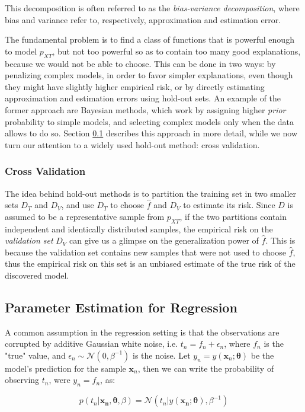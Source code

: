 \documentclass[12pt]{book}
\begin{document}
This decomposition is often referred to as the \emph{bias-variance decomposition}, where bias and variance refer to, respectively, approximation and estimation error.

The fundamental problem is to find a class of functions that is powerful enough to model $p_{XT}$, but not too powerful so as to contain too many good explanations, because we would not be able to choose. This can be done in two ways: by penalizing complex models, in order to favor simpler explanations, even though they might have slightly higher empirical risk, or by directly estimating approximation and estimation errors using hold-out sets. An example of the former approach are Bayesian methods, which work by assigning higher \emph{prior} probability to simple models, and selecting complex models only when the data allows to do so. Section 
\ref{sec:regression_fit} describes this approach in more detail, while we now turn our attention to a widely used hold-out method: cross validation.

\subsubsection{Cross Validation}
The idea behind hold-out methods is to partition the training set in two smaller sets $D_T$ and $D_V$, and use $D_T$ to choose $\hat{f}$ and $D_V$ to estimate its risk. Since $D$ is assumed to be a representative sample from $p_{XT}$, if the two partitions contain independent and identically distributed samples, the empirical risk on the \emph{validation set} $D_V$ can give us a glimpse on the generalization power of $\hat{f}$. This is because the validation set contains new samples that were not used to choose $\hat{f}$, thus the empirical risk on this set is an unbiased estimate of the true risk of the discovered model.

\subsection{Parameter Estimation for Regression}
\label{sec:regression_fit}
A common assumption in the regression setting is that the observations are corrupted by additive Gaussian white noise, i.e. $t_n=f_n+\epsilon_n$, where $f_n$ is the "true" value, and $\epsilon_n\sim\mathcal{N}(0,\beta^{-1})$ is the noise. Let $y_n=y(\bm x_n;\bm{\theta})$ be the model's prediction for the sample $\bm x_n$, then we can write the probability of observing $t_n$, were $y_n=f_n$, as:

\begin{equation}
p(t_n\vert \bm{x_n},\bm\theta,\beta)=\mathcal{N}(t_n\vert y(\bm{x_n};\bm\theta),\beta^{-1})
\end{equation}
\end{document}

